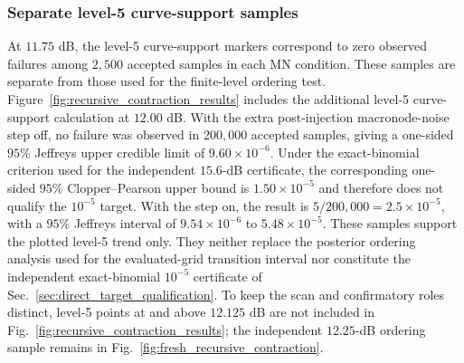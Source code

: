 \documentclass[aps,
prx,
superscriptaddress,
reprint,
longbibliography,
floatfix]{revtex4-2}
\newcounter{criterion}[section]
\begin{document}
\subsubsection{Separate level-5 curve-support samples}\label{app:curve_support}
At $11.75$ dB, the level-5 curve-support markers correspond to zero observed failures among $2{,}500$ accepted samples in each MN condition. These samples are separate from those used for the finite-level ordering test.
Figure~\ref{fig:recursive_contraction_results} includes the additional level-5 curve-support calculation at $12.00$ dB. With the extra post-injection macronode-noise step off, no failure was observed in $200{,}000$ accepted samples, giving a one-sided $95\%$ Jeffreys upper credible limit of $9.60\times10^{-6}$. Under the exact-binomial criterion used for the independent $15.6$-dB certificate, the corresponding one-sided $95\%$ Clopper--Pearson upper bound is $1.50\times10^{-5}$ and therefore does not qualify the $10^{-5}$ target. With the step on, the result is $5/200{,}000=2.5\times10^{-5}$, with a $95\%$ Jeffreys interval of $9.54\times10^{-6}$ to $5.48\times10^{-5}$. These samples support the plotted level-5 trend only. They neither replace the posterior ordering analysis used for the evaluated-grid transition interval nor constitute the independent exact-binomial $10^{-5}$ certificate of Sec.~\ref{sec:direct_target_qualification}. To keep the scan and confirmatory roles distinct, level-5 points at and above $12.125$ dB are not included in Fig.~\ref{fig:recursive_contraction_results}; the independent $12.25$-dB ordering sample remains in Fig.~\ref{fig:fresh_recursive_contraction}.
\end{document}

